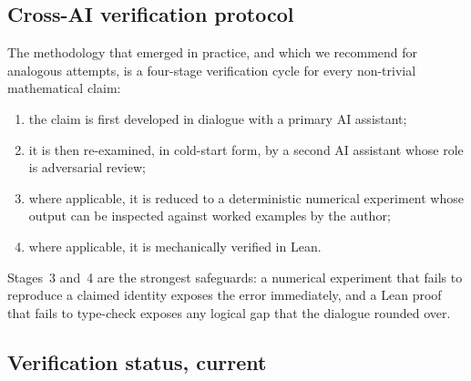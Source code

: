 \documentclass[11pt,a4paper]{article}
\theoremstyle{definition}
\begin{document}
\subsection{Cross-AI verification protocol}

The methodology that emerged in practice, and which we recommend
for analogous attempts, is a four-stage verification cycle for
every non-trivial mathematical claim:
\begin{enumerate}
  \item the claim is first developed in dialogue with a primary
        AI assistant;
  \item it is then re-examined, in cold-start form, by a second
        AI assistant whose role is adversarial review;
  \item where applicable, it is reduced to a deterministic
        numerical experiment whose output can be inspected
        against worked examples by the author;
  \item where applicable, it is mechanically verified in Lean.
\end{enumerate}
Stages~3 and~4 are the strongest safeguards: a numerical
experiment that fails to reproduce a claimed identity exposes the
error immediately, and a Lean proof that fails to type-check
exposes any logical gap that the dialogue rounded over.

\subsection{Verification status, current}
\end{document}

